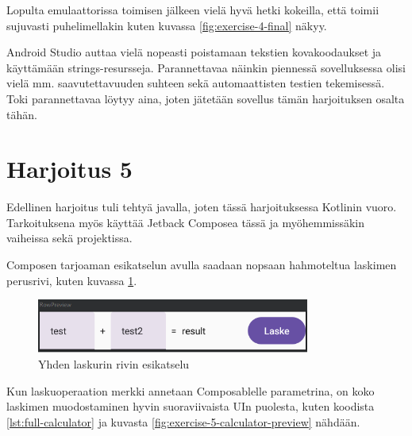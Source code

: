 Lopulta emulaattorissa toimisen jälkeen vielä hyvä hetki kokeilla, että toimii
sujuvasti puhelimellakin kuten kuvassa \ref{fig:exercise-4-final} näkyy.

Android Studio auttaa vielä nopeasti poistamaan tekstien kovakoodaukset ja
käyttämään strings-resursseja. Parannettavaa näinkin piennessä sovelluksessa
olisi vielä mm. saavutettavuuden suhteen sekä automaattisten testien
tekemisessä. Toki parannettavaa löytyy aina, joten jätetään sovellus tämän
harjoituksen osalta tähän.


\section{Harjoitus 5}

Edellinen harjoitus tuli tehtyä javalla, joten tässä harjoituksessa Kotlinin
vuoro. Tarkoituksena myös käyttää Jetback Composea tässä ja myöhemmissäkin
vaiheissa sekä projektissa.

Composen tarjoaman esikatselun avulla saadaan nopsaan hahmoteltua laskimen
perusrivi, kuten kuvassa \ref{fig:exercise-5-row-preview}.

\begin{figure}[h!]
    \centering
    \includegraphics[width=0.8\textwidth]{figures/exercise-5-row-preview.png}
    \caption{Yhden laskurin rivin esikatselu}
    \label{fig:exercise-5-row-preview}
\end{figure}

Kun laskuoperaation merkki annetaan Composablelle parametrina, on koko laskimen
muodostaminen hyvin suoraviivaista UIn puolesta, kuten koodista
\ref{lst:full-calculator} ja kuvasta \ref{fig:exercise-5-calculator-preview}
nähdään.

